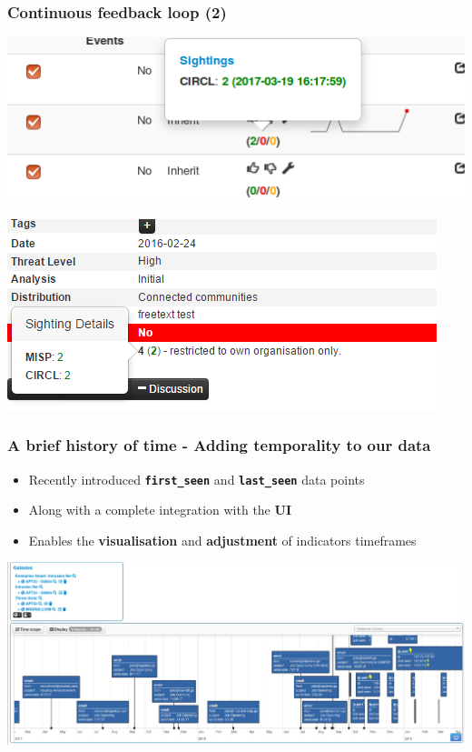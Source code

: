 \begin{frame}
  \frametitle{Continuous feedback loop (2)}
  \begin{center}
    \includegraphics[scale=0.5]{sighting-n.png}
  \end{center}
  \begin{center}
    \includegraphics[scale=0.60]{Sightings2.PNG}
  \end{center}  
\end{frame}

\begin{frame}
  \frametitle{A brief history of time - Adding temporality to our data}
  \begin{itemize}
    \item Recently introduced {\bf \texttt{first\_seen}} and {\bf \texttt{last\_seen}} data points
    \item Along with a complete integration with the {\bf UI}
    \item Enables the {\bf visualisation} and {\bf adjustment} of indicators timeframes 
  \end{itemize}
  \begin{center}
    \includegraphics[width=1.0\linewidth]{timeline-misp-overview.png}
  \end{center}
\end{frame}

